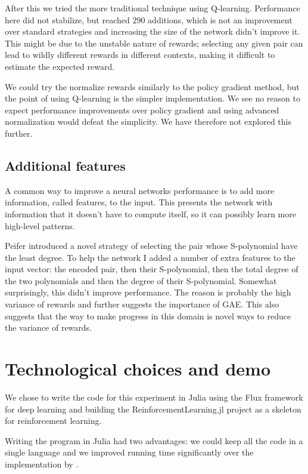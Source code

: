 \documentclass{article}
\theoremstyle{changedot}
\theoremstyle{changedotbreak}
\theoremstyle{nonumberplain}
\begin{document}
After this we tried the more traditional technique using Q-learning. Performance here did not stabilize, but reached 290 additions, which is not an improvement over standard strategies and increasing the size of the network didn't improve it. This might be due to the unstable nature of rewards; selecting any given pair can lead to wildly different rewards in different contexts, making it difficult to estimate the expected reward.

We could try the normalize rewards similarly to the policy gradient method, but the point of using Q-learning is the simpler implementation. We see no reason to expect performance improvements over policy gradient and using advanced normalization would defeat the simplicity. We have therefore not explored this further.

\subsection{Additional features}
A common way to improve a neural networks performance is to add more information, called features, to the input. This presents the network with information that it doesn't have to compute itself, so it can possibly learn more high-level patterns.

Peifer introduced a novel strategy of selecting the pair whose S-polynomial have the least degree. To help the network I added a number of extra features to the input vector: the encoded pair, then their S-polynomial, then the total degree of the two polynomials and then the degree of their S-polynomial. Somewhat surprisingly, this didn't improve performance. The reason is probably the high variance of rewards and further suggests the importance of GAE. This also suggests that the way to make progress in this domain is novel ways to reduce the variance of rewards.

\section{Technological choices and demo}
We chose to write the code for this experiment in Julia \cite{julia} using the Flux \cite{Flux.jl} framework for deep learning and building the ReinforcementLearning.jl \cite{ReinforcementLearning.jl} project as a skeleton for reinforcement learning.

Writing the program in Julia had two advantages: we could keep all the code in a single language and we improved running time significantly over the implementation by \cite{peifer}.
\end{document}
